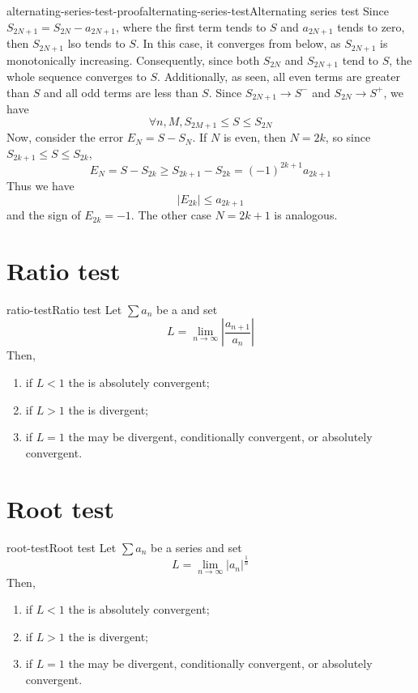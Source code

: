\documentclass[preview]{standalone}
\begin{document}
\begin{snippetproof}{alternating-series-test-proof}{alternating-series-test}{Alternating series test}
    Since \(S_{2N + 1} = S_{2N} - a_{2N + 1}\), where the first term tends to \(S\) and \(a_{2N+1}\) tends to zero,
    then \(S_{2N+1}\) lso tends to \(S\). In this case, it converges from below, as \(S_{2N+1}\) is monotonically increasing.
    Consequently, since both \(S_{2N}\) and \(S_{2N+1}\) tend to \(S\), the whole sequence converges to \(S\).
    Additionally, as seen, all even terms are greater than \(S\) and all odd terms are less than \(S\).
    Since \(S_{2N+1} \to S^-\) and \(S_{2N} \to S^+\), we have
    \[
        \forall n, M, S_{2M+1} \leq S \leq S_{2N}
    \]
    Now, consider the error \(E_N = S - S_N\).
    If \(N\) is even, then \(N=2k\), so since \(S_{2k+1} \leq S \leq S_{2k}\),
    \[E_N = S - S_{2k} \geq S_{2k + 1} - S_{2k} = {(-1)}^{2k+1} a_{2k+1}\]
    Thus we have
    \[
        |E_{2k}| \leq a_{2k+1}
    \]
    and the sign of \(E_{2k} = -1\).
    The other case \(N=2k+1\) is analogous.
\end{snippetproof}

\section{Ratio test}

\begin{snippettheorem}{ratio-test}{Ratio test}
    Let \(\sum a_n\) be a \series and set
    \[
        L = \lim_{n \to \infty} \left| \frac{a_{n+1}}{a_n} \right|
    \]
    Then,
    \begin{enumerate}
        \item if \(L < 1\) the \series is absolutely convergent;
        \item if \(L > 1\) the \series is divergent;
        \item if \(L = 1\) the \series may be divergent, conditionally convergent, or absolutely convergent.
    \end{enumerate}
\end{snippettheorem}

\section{Root test}

\begin{snippettheorem}{root-test}{Root test}
    Let \(\sum a_n\) be a series and set
    \[
        L = \lim_{n \to \infty} {|a_n|}^{\frac{1}{n}}
    \]
    Then,
    \begin{enumerate}
        \item if \(L < 1\) the \series is absolutely convergent;
        \item if \(L > 1\) the \series is divergent;
        \item if \(L = 1\) the \series may be divergent, conditionally convergent, or absolutely convergent.
    \end{enumerate}
\end{snippettheorem}
\end{document}
